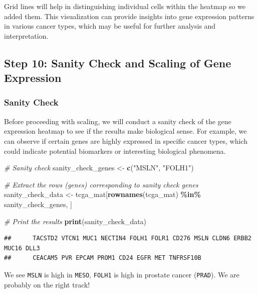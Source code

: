 \documentclass[
]{book}
\newenvironment{Shaded}{\begin{snugshade}}{\end{snugshade}}
\newcommand{\CommentTok}[1]{\textcolor[rgb]{0.56,0.35,0.01}{\textit{#1}}}
\newcommand{\FunctionTok}[1]{\textcolor[rgb]{0.13,0.29,0.53}{\textbf{#1}}}
\newcommand{\NormalTok}[1]{#1}
\newcommand{\OtherTok}[1]{\textcolor[rgb]{0.56,0.35,0.01}{#1}}
\newcommand{\SpecialCharTok}[1]{\textcolor[rgb]{0.81,0.36,0.00}{\textbf{#1}}}
\newcommand{\StringTok}[1]{\textcolor[rgb]{0.31,0.60,0.02}{#1}}
\begin{document}
Grid lines will help in distinguishing individual cells within the heatmap so we added them.
This visualization can provide insights into gene expression patterns in various cancer types, which may be useful for further analysis and interpretation.

\hypertarget{step-10-sanity-check-and-scaling-of-gene-expression}{%
\subsection{Step 10: Sanity Check and Scaling of Gene Expression}\label{step-10-sanity-check-and-scaling-of-gene-expression}}

\hypertarget{sanity-check}{%
\subsubsection{Sanity Check}\label{sanity-check}}

Before proceeding with scaling, we will conduct a sanity check of the gene expression heatmap to see if the results make biological sense. For example, we can observe if certain genes are highly expressed in specific cancer types, which could indicate potential biomarkers or interesting biological phenomena.

\begin{Shaded}
\begin{Highlighting}[]
\CommentTok{\# Sanity check}
\NormalTok{sanity\_check\_genes }\OtherTok{\textless{}{-}} \FunctionTok{c}\NormalTok{(}\StringTok{"MSLN"}\NormalTok{, }\StringTok{"FOLH1"}\NormalTok{)}

\CommentTok{\# Extract the rows (genes) corresponding to sanity check genes}
\NormalTok{sanity\_check\_data }\OtherTok{\textless{}{-}}\NormalTok{ tcga\_mat[}\FunctionTok{rownames}\NormalTok{(tcga\_mat) }\SpecialCharTok{\%in\%}\NormalTok{ sanity\_check\_genes, ]}

\CommentTok{\# Print the results}
\FunctionTok{print}\NormalTok{(sanity\_check\_data)}
\end{Highlighting}
\end{Shaded}

\begin{verbatim}
##      TACSTD2 VTCN1 MUC1 NECTIN4 FOLH1 FOLR1 CD276 MSLN CLDN6 ERBB2 MUC16 DLL3
##      CEACAM5 PVR EPCAM PROM1 CD24 EGFR MET TNFRSF10B
\end{verbatim}

We see \texttt{MSLN} is high in \texttt{MESO}, \texttt{FOLH1} is high in prostate cancer (\texttt{PRAD}). We are probably on the right track!
\end{document}
